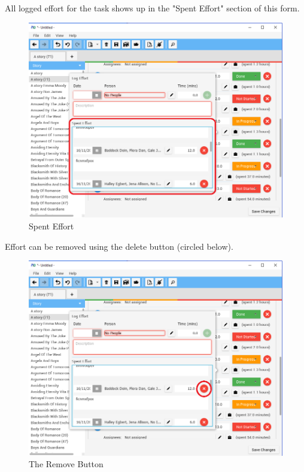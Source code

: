 All logged effort for the task shows up in the "Spent Effort" section of this form. 

\begin{figure}[H]
\centering
\includegraphics[width=\textwidth]{images/screenshots/logging4.png}
\caption{Spent Effort}
\label{fig:new_project}
\end{figure}

Effort can be removed using the delete button (circled below).

\begin{figure}[H]
\centering
\includegraphics[width=\textwidth]{images/screenshots/logging5.png}
\caption{The Remove Button}
\label{fig:new_project}
\end{figure}